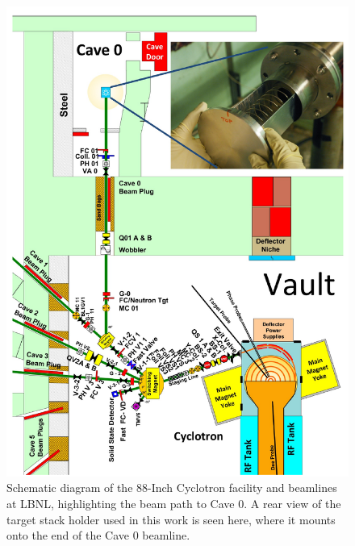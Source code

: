 



\begin{figure}
 \centering
 \includegraphics[height=0.90\textheight]{./figures/88beampath-cropped.pdf}
 \caption{Schematic diagram of the 88-Inch Cyclotron facility and beamlines at LBNL, highlighting the beam path to Cave 0.  A rear view of the target stack holder used in this work is seen here, where it mounts onto the end of the Cave 0 beamline. }
 \label{fig:fe_beamline_schematic}
\end{figure}

